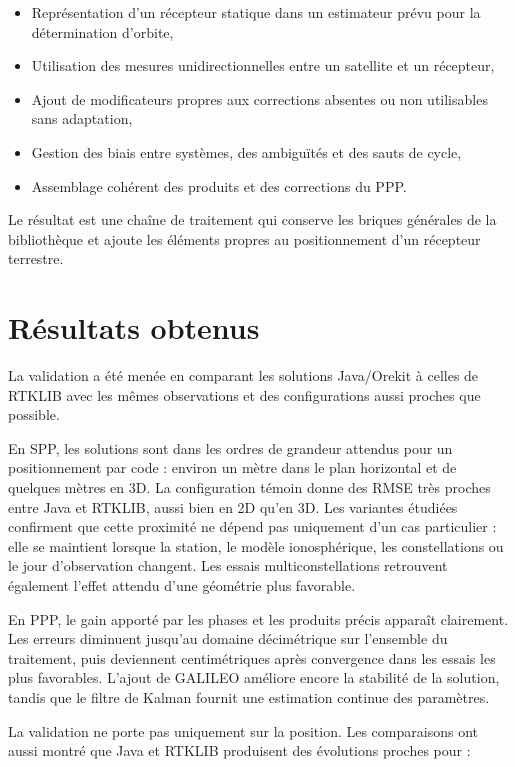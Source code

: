 \begin{itemize}
    \item Représentation d'un récepteur statique dans un estimateur prévu pour
    la détermination d'orbite,
    \item Utilisation des mesures unidirectionnelles entre un satellite et un
    récepteur,
    \item Ajout de modificateurs propres aux corrections absentes ou non
    utilisables sans adaptation,
    \item Gestion des biais entre systèmes, des ambiguïtés et des sauts de
    cycle,
    \item Assemblage cohérent des produits et des corrections du PPP.
\end{itemize}

Le résultat est une chaîne de traitement qui conserve les briques générales de la
bibliothèque et ajoute les éléments propres au positionnement d'un récepteur
terrestre.

\section{Résultats obtenus}

La validation a été menée en comparant les solutions Java/Orekit à celles de
RTKLIB avec les mêmes observations et des configurations aussi proches que
possible.

En SPP, les solutions sont dans les ordres de grandeur attendus pour un
positionnement par code : environ un mètre dans le plan horizontal et de quelques
mètres en 3D. La configuration témoin donne des RMSE très proches entre Java et
RTKLIB, aussi bien en 2D qu'en 3D. Les variantes étudiées confirment que cette
proximité ne dépend pas uniquement d'un cas particulier : elle se maintient
lorsque la station, le modèle ionosphérique, les constellations ou le jour
d'observation changent. Les essais multiconstellations retrouvent également
l'effet attendu d'une géométrie plus favorable.

En PPP, le gain apporté par les phases et les produits précis apparaît
clairement. Les erreurs diminuent jusqu'au domaine décimétrique sur l'ensemble
du traitement, puis deviennent centimétriques après convergence dans les essais
les plus favorables. L'ajout de GALILEO améliore encore la stabilité de la
solution, tandis que le filtre de Kalman fournit une estimation continue des
paramètres.

La validation ne porte pas uniquement sur la position. Les comparaisons ont
aussi montré que Java et RTKLIB produisent des évolutions proches pour :

